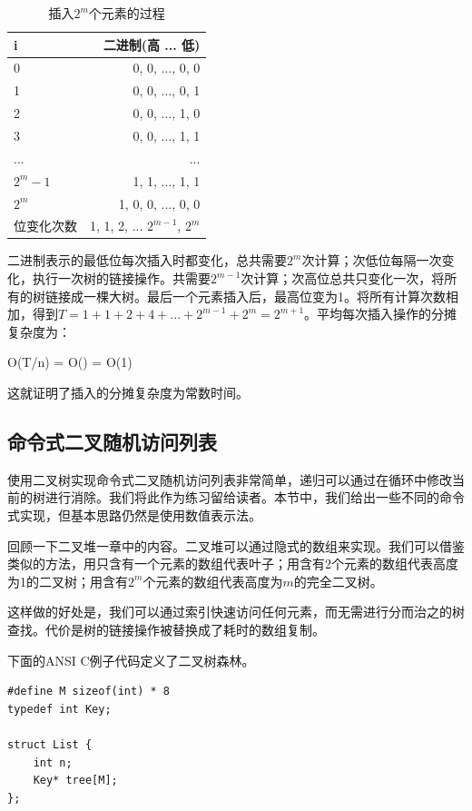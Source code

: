 \documentclass[b5paper]{ctexart}
\begin{document}
\begin{table}[htbp]
\centering
\begin{tabular}{|l|r|}
  \hline
  i & 二进制(高 ... 低) \\
  \hline
  0 & 0, 0, ..., 0, 0 \\
  1 & 0, 0, ..., 0, 1 \\
  2 & 0, 0, ..., 1, 0 \\
  3 & 0, 0, ..., 1, 1 \\
  ... & ... \\
  $2^m-1$ & 1, 1, ..., 1, 1 \\
  $2^m$ & 1, 0, 0, ..., 0, 0 \\
  \hline
  位变化次数 & 1, 1, 2, ... $2^{m-1}$, $2^m$ \\
  \hline
\end{tabular}
\caption{插入$2^m$个元素的过程}
\label{tab:ralist-insertion}
\end{table}

二进制表示的最低位每次插入时都变化，总共需要$2^m$次计算；次低位每隔一次变化，执行一次树的链接操作。共需要$2^{m-1}$次计算；次高位总共只变化一次，将所有的树链接成一棵大树。最后一个元素插入后，最高位变为1。将所有计算次数相加，得到$T = 1 + 1 + 2 + 4 + ... + 2^{m-1} + 2^m = 2^{m+1}$。平均每次插入操作的分摊复杂度为：

\be
O(T/n) = O() = O(1)
\ee

这就证明了插入的分摊复杂度为常数时间。

\subsection{命令式二叉随机访问列表}

使用二叉树实现命令式二叉随机访问列表非常简单，递归可以通过在循环中修改当前的树进行消除。我们将此作为练习留给读者。本节中，我们给出一些不同的命令式实现，但基本思路仍然是使用数值表示法。

回顾一下二叉堆一章中的内容。二叉堆可以通过隐式的数组来实现。我们可以借鉴类似的方法，用只含有一个元素的数组代表叶子；用含有2个元素的数组代表高度为1的二叉树；用含有$2^m$个元素的数组代表高度为$m$的完全二叉树。

这样做的好处是，我们可以通过索引快速访问任何元素，而无需进行分而治之的树查找。代价是树的链接操作被替换成了耗时的数组复制。

下面的ANSI C例子代码定义了二叉树森林。

\lstset{language=C}
\begin{lstlisting}
#define M sizeof(int) * 8
typedef int Key;

struct List {
    int n;
    Key* tree[M];
};
\end{lstlisting}
\end{document}

